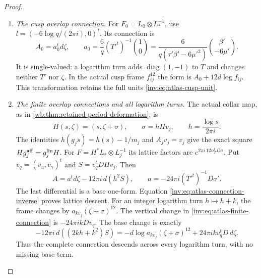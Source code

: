 \begin{proof}
\begin{enumerate}[label=\arabic*.,leftmargin=*]
Every use of this inverse is on one of the three annuli above.
By \cref{inv:A2.1},
$6\mu_z^2-\tau_z\beta_z=\tau_z^2E_4(\tau)^2/E_6(\tau)$,
with the apparent poles removed, has order two at the order-three
point, order zero at the order-four point, and no further zeros on
the regular locus.  A local change of base coordinate multiplies
the determinant by the square of a nonzero derivative.  Thus
$\det T'$ is nonzero at every point of every annular cover used
here.  No inverse is taken at a special fibre.  In the cusp variable
its leading term is $1/(4\pi^2q^2)$, in agreement with the exact
logarithmic period matrix.

\item \emph{The cusp overlap connection.}
For $F_0=L_0\otimes L_*^{-1}$, use
$l=(-6\log q/(2\pi i),0)^t$.  Its connection is
\begin{equation}\label{inv:eq:atlas-cusp-connection}
 A_0=a_0^td\zeta,\qquad
 a_0=\frac6q(T'^t)^{-1}\binom10
 =\frac6{q(\tau'\beta'-6\mu'^2)}\binom{\beta'}{-6\mu'}.
\end{equation}
It is single-valued: a logarithm turn adds
$\operatorname{diag}(1,-1)$ to $T$ and changes neither $T'$ nor
$\zeta$.  In the actual cusp frame $f_{ij}^{12}$ the form is
$A_0+12d\log f_{ij}$.  This transformation retains the full
units \eqref{inv:eq:atlas-cusp-unit}.

\item \emph{The finite overlap connections and all logarithm turns.}
The actual collar map, as in
\cref{wb:thm:retained-period-deformation}, is
\[
 H(s,\zeta)=(s,\zeta+\sigma),\qquad
 \sigma=h\Pi v_j,\qquad h=\frac{\log s}{2\pi i}.
\]
The identities $h(g_js)=h(s)-1/m_j$ and $A_jv_j=v_j$ give the
exact square $Hg_j^{\rm aff}=g_j^{\rm lin}H$.
For $F=H^*L_*\otimes L_j^{-1}$ its lattice factors are
$e^{2\pi i\,12n_T^tD\sigma}$.  Put
$v_q=(v_u,v_\gamma)^t$ and $S=v_q^tD\Pi v_j$.  Then
\begin{equation}\label{inv:eq:atlas-finite-connection}
 A=a^td\zeta-12\pi i\,d(h^2S),\qquad
 a=-24\pi i(T'^t)^{-1}D\sigma'.
\end{equation}
The last differential is a base one-form.
Equation \eqref{inv:eq:atlas-connection-inverse} proves lattice descent.
For an integer logarithm turn $h\mapsto h+k$, the frame changes by
$a_{kv_j}(\zeta+\sigma)^{12}$.  The vertical change in
\eqref{inv:eq:atlas-finite-connection} is
$-24\pi i kDv_q$.  The base change is exactly
\[
 -12\pi i\,d((2kh+k^2)S)
 =-d\log a_{kv_j}(\zeta+\sigma)^{12}
      +24\pi i k v_q^tD\,d\zeta.
\]
Thus the complete connection descends across every logarithm turn,
with no missing base term.


\end{enumerate}
\end{proof}
